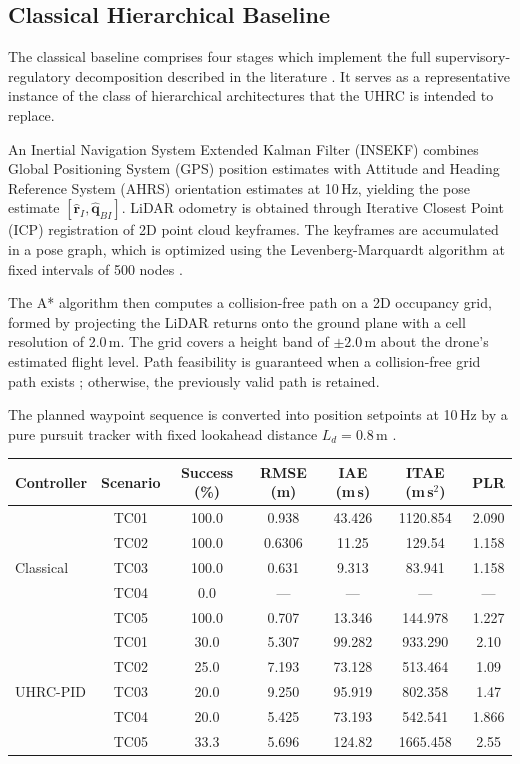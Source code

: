\documentclass[12pt, a4paper]{article}
\begin{document}
\subsection{Classical Hierarchical Baseline}
\label{sec:baseline}


The classical baseline comprises four stages which implement the full supervisory-regulatory decomposition described in the literature \parencite{sanders_hierarchical_1998, scattolini_hierarchical_2007}.
It serves as a representative instance of the class of hierarchical architectures that the UHRC is intended to replace.

An Inertial Navigation System Extended Kalman Filter (INSEKF) combines Global Positioning System (GPS) position estimates with Attitude and Heading Reference System (AHRS) orientation estimates at 10\,Hz, yielding the pose estimate $[\hat{\mathbf{r}}_I, \hat{\mathbf{q}}_{BI}]$.
LiDAR odometry is obtained through Iterative Closest Point (ICP) registration of 2D point cloud keyframes.
The keyframes are accumulated in a pose graph, which is optimized using the Levenberg-Marquardt algorithm at fixed intervals of 500 nodes \parencite{gupta_simultaneous_2022, milijas_comparison_2021}.

The A* algorithm then computes a collision-free path on a 2D occupancy grid, formed by projecting the LiDAR returns onto the ground plane with a cell resolution of 2.0\,m.
The grid covers a height band of $\pm 2.0$\,m about the drone's estimated flight level.
Path feasibility is guaranteed when a collision-free grid path exists \parencite{zhou_review_2021}; otherwise, the previously valid path is retained.


The planned waypoint sequence is converted into position setpoints at 10\,Hz by a pure pursuit tracker with fixed lookahead distance $L_d = 0.8$\,m \parencite{huang_path_2020}.
\begin{tabular}{lcccccc}
\hline
Controller & Scenario & Success (\%) & RMSE (m) & IAE (m\,s) & ITAE (m\,s$^2$) & PLR \\
\hline
\multirow{5}{*}{Classical}
 & TC01      & 100.0 & 0.938  & 43.426  & 1120.854   & 2.090 \\
 & TC02             & 100.0 & 0.6306    & 11.25     & 129.54       & 1.158 \\
 & TC03  & 100.0 & 0.631  & 9.313   & 83.941     & 1.158 \\
 & TC04     & 0.0   & ---    & ---     & ---        & ---   \\
 & TC05     & 100.0 & 0.707  & 13.346  & 144.978    & 1.227 \\
\hline
\multirow{5}{*}{UHRC-PID}
 & TC01          & 30.0   & 5.307  & 99.282  & 933.290  & 2.10 \\
 & TC02              & 25.0   & 7.193  & 73.128  & 513.464   & 1.09 \\
 & TC03        & 20.0   & 9.250  & 95.919  & 802.358   & 1.47 \\
 & TC04     & 20.0   & 5.425 & 73.193 & 542.541 & 1.866 \\
 & TC05     & 33.3  & 5.696  & 124.82  & 1665.458  & 2.55 \\
\hline
\end{tabular}
\end{document}
